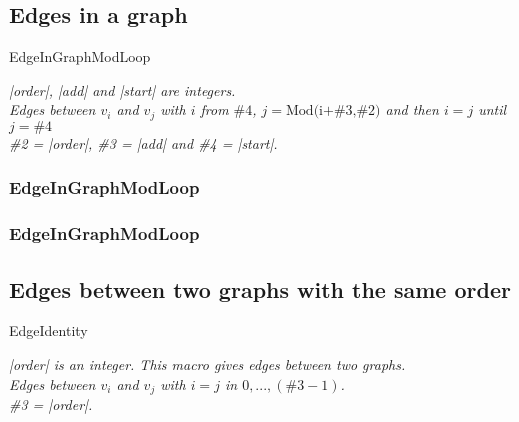 \newpage
\subsection{Edges in a graph  }
\begin{NewMacroBox}{EdgeInGraphModLoop}{}

\medskip
\emph{ |order|, |add| and |start| are integers.\\
Edges between $v_i$ and $v_j$ with $i$ from $\#4$, $j=\text{Mod(i+\#3,\#2)}$ and then $i=j$ until $j=\#4$\\
\#2 = |order|,  \#3 = |add| and \#4 = |start|.}
\end{NewMacroBox}

\subsubsection{EdgeInGraphModLoop}
\begin{center}
\begin{tkzexample}
\end{tkzexample}
\end{center}

\subsubsection{EdgeInGraphModLoop}
\begin{center}
\begin{tkzexample}
\end{tkzexample}
\end{center}


\newpage
\subsection{Edges between two graphs with the same order }

\begin{NewMacroBox}{EdgeIdentity}{}

\medskip
\emph{|order| is an integer. This macro gives edges between two graphs.\\
Edges between $v_i$ and $v_j$ with $i=j$ in $0,...,(\text{\#3}-1)$.\\
\#3 = |order|.\\}
\end{NewMacroBox}  


